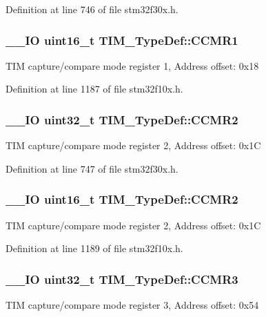 Definition at line 746 of file stm32f30x.\-h.

\hypertarget{struct_t_i_m___type_def_a9094f9bb312461d2fc1499f5f8d91c64}{
\subsubsection[{C\-C\-M\-R1}]{\setlength{\rightskip}{0pt plus 5cm}\-\_\-\-\_\-\-I\-O {\bf uint16\-\_\-t} T\-I\-M\-\_\-\-Type\-Def\-::\-C\-C\-M\-R1}}\label{struct_t_i_m___type_def_a9094f9bb312461d2fc1499f5f8d91c64}
T\-I\-M capture/compare mode register 1, Address offset\-: 0x18 

Definition at line 1187 of file stm32f10x.\-h.

\hypertarget{struct_t_i_m___type_def_aa8129ca70a2232c91c8cfcaf375249f6}{
\subsubsection[{C\-C\-M\-R2}]{\setlength{\rightskip}{0pt plus 5cm}\-\_\-\-\_\-\-I\-O {\bf uint32\-\_\-t} T\-I\-M\-\_\-\-Type\-Def\-::\-C\-C\-M\-R2}}\label{struct_t_i_m___type_def_aa8129ca70a2232c91c8cfcaf375249f6}
T\-I\-M capture/compare mode register 2, Address offset\-: 0x1\-C 

Definition at line 747 of file stm32f30x.\-h.

\hypertarget{struct_t_i_m___type_def_a22bb9f39aae46365d3ec3c5973f90039}{
\subsubsection[{C\-C\-M\-R2}]{\setlength{\rightskip}{0pt plus 5cm}\-\_\-\-\_\-\-I\-O {\bf uint16\-\_\-t} T\-I\-M\-\_\-\-Type\-Def\-::\-C\-C\-M\-R2}}\label{struct_t_i_m___type_def_a22bb9f39aae46365d3ec3c5973f90039}
T\-I\-M capture/compare mode register 2, Address offset\-: 0x1\-C 

Definition at line 1189 of file stm32f10x.\-h.

\hypertarget{struct_t_i_m___type_def_ac0dcd8f9118b07b16cd79d03cb1a0904}{
\subsubsection[{C\-C\-M\-R3}]{\setlength{\rightskip}{0pt plus 5cm}\-\_\-\-\_\-\-I\-O {\bf uint32\-\_\-t} T\-I\-M\-\_\-\-Type\-Def\-::\-C\-C\-M\-R3}}\label{struct_t_i_m___type_def_ac0dcd8f9118b07b16cd79d03cb1a0904}
T\-I\-M capture/compare mode register 3, Address offset\-: 0x54 

